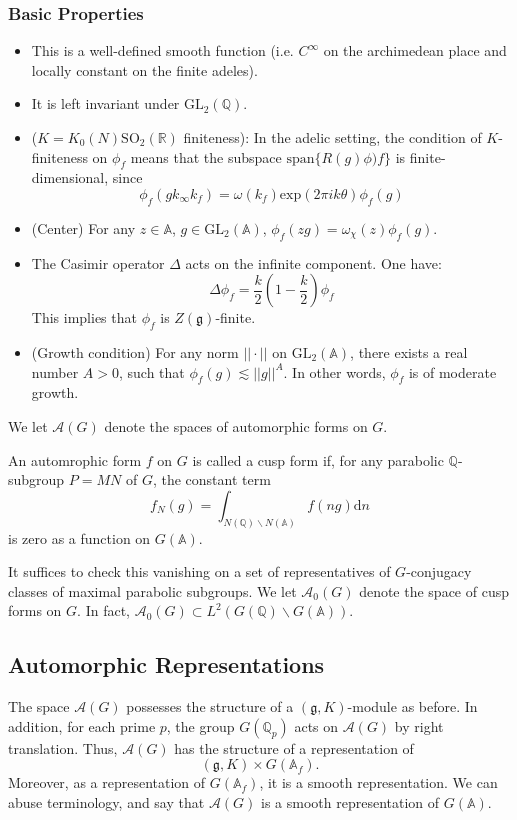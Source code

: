 \documentclass[11pt,english]{smfart}
\theoremstyle{definition}
\theoremstyle{remark}
\begin{document}
\subsubsection{Basic Properties}
\begin{itemize}
\item This is a well-defined smooth function (i.e. $C^{\infty}$ on the archimedean place and locally constant on the finite adeles).
\item It is left invariant under $\mathrm{GL}_2(\mathbb{Q})$.
\item ($K=K_0(N)\mathrm{SO}_2(\mathbb{R})$ finiteness): In the adelic setting, the condition of $K$-finiteness on $\phi_f$ means that the subspace $\mathrm{span}\{R(g) \phi)f\}$ is finite-dimensional, since
\[\phi_f(gk_\infty k_f)=\omega (k_f) \mathrm{exp} (2\pi ik\theta) \phi_f(g)\]
\item (Center) For any $z\in \mathbb{A}$, $g\in \mathrm{GL_2}(\mathbb{A})$, $\phi_f(zg)=\omega _\chi (z) \phi _f(g)$.
\item The Casimir operator $\Delta$ acts on the infinite component. One have:
\[ \Delta \phi_f= \frac{k}{2}(1-\frac{k}{2}) \phi_f\]
This implies that $\phi_f$ is $Z(\mathfrak{g})$-finite.
\item (Growth condition) For any norm $||\cdot||$ on $\mathrm{GL_2}(\mathbb{A})$, there exists a real number $A >0$, such that $\phi_f(g) \lesssim ||g||^{A}$. In other words, $\phi_f$ is of moderate growth.
\end{itemize}
We let $\mathcal{A}(G)$ denote the spaces of automorphic forms on $G$.

An automrophic form $ f $ on $ G $ is called a cusp form if, for any parabolic $\mathbb{Q}$-subgroup $ P=M N $ of $ G $, the constant term
\[f_{N}(g)=\int_{N(\mathbb{Q}) \backslash N(\mathbb{A})} f(n g) \mathrm{d} n\]
is zero as a function on $ G(\mathbb{A}) $.

It suffices to check this vanishing on a set of representatives of $ G $-conjugacy classes of maximal parabolic subgroups.
We let $ \mathcal{A}_{0}(G) $ denote the space of cusp forms on $ G $. In fact, $\mathcal{A}_0(G) \subset  L^2(G(\mathbb{Q}) \backslash G(\mathbb{A}))$.
\subsection{Automorphic Representations}
The space $ \mathcal{A}(G) $ possesses the structure of a $ (\mathfrak{g}, K) $-module as before.
In addition, for each prime $ p $, the group $ G\left(\mathbb{Q}_{p}\right) $ acts on $ \mathcal{A}(G) $ by right translation. Thus, $ \mathcal{A}(G) $ has the structure of a representation of
\[(\mathfrak{g}, K) \times G\left(\mathbb{A}_{f}\right) .\]
Moreover, as a representation of $ G\left(\mathbb{A}_{f}\right) $, it is a smooth representation. We can abuse terminology, and say that $ \mathcal{A}(G) $ is a smooth representation of $ G(\mathbb{A}) $.
\end{document}
